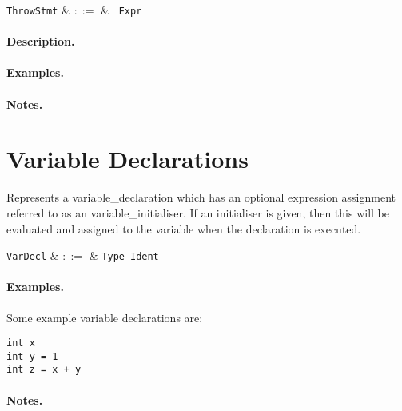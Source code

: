 \begin{syntax}
  \verb+ThrowStmt+ & $::=$ & \ \verb+Expr+\\
\end{syntax}

\paragraph{Description.}

\paragraph{Examples.}

\paragraph{Notes.} 


\section{Variable Declarations}

Represents a \gls{variable_declaration} which has an optional expression assignment referred to as an \gls{variable_initialiser}.  If an initialiser is given, then this will be evaluated and assigned to the variable when the declaration is executed.

\begin{syntax}
  \verb+VarDecl+ & $::=$ & \verb+Type+\ \verb+Ident+\ \big[\
  \token{=}\ \verb+Expr+\ \big]\\
\end{syntax}

\paragraph{Examples.} Some example variable declarations are:
\begin{lstlisting}
int x
int y = 1
int z = x + y
\end{lstlisting}

\paragraph{Notes.} 



